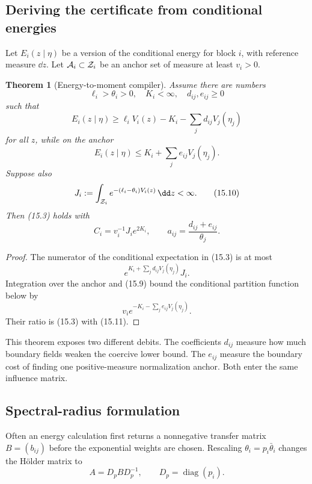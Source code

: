 \documentclass[11pt]{article}
\newtheorem{theorem}{Theorem}[section]
\theoremstyle{remark}
\begin{document}
\subsection{Deriving the certificate from conditional energies}

Let \(E_i(z\mid\eta)\) be a version of the conditional energy for
block \(i\), with reference measure \(\dd z\).  Let
\({\cal A}_i\subset{\cal Z}_i\) be an anchor set of measure at least
\(v_i>0\).

\begin{theorem}[Energy-to-moment compiler]
\label{thm:v17v15-energy-compiler}
Assume there are numbers
\[
 \ell_i>\theta_i>0,\quad K_i<\infty,\quad
 d_{ij},e_{ij}\geq0                                \tag{15.7}
\]
such that
\[
 E_i(z\mid\eta)
 \geq
 \ell_iV_i(z)-K_i-\sum_jd_{ij}V_j(\eta_j)           \tag{15.8}
\]
for all \(z\), while on the anchor
\[
 E_i(z\mid\eta)
 \leq K_i+\sum_je_{ij}V_j(\eta_j).                 \tag{15.9}
\]
Suppose also
\[
 J_i:=\int_{{\cal Z}_i}
 e^{-(\ell_i-\theta_i)V_i(z)}\,\dd z<\infty.        \tag{15.10}
\]
Then (15.3) holds with
\[
 C_i=v_i^{-1}J_i e^{2K_i},\qquad
 a_{ij}=\frac{d_{ij}+e_{ij}}{\theta_j}.            \tag{15.11}
\]
\end{theorem}

\begin{proof}
The numerator of the conditional expectation in (15.3) is at most
\[
 e^{K_i+\sum_jd_{ij}V_j(\eta_j)}J_i.
\]
Integration over the anchor and (15.9) bound the conditional
partition function below by
\[
 v_i e^{-K_i-\sum_je_{ij}V_j(\eta_j)}.
\]
Their ratio is (15.3) with (15.11).
\end{proof}

This theorem exposes two different debits.  The coefficients
\(d_{ij}\) measure how much boundary fields weaken the coercive
lower bound.  The \(e_{ij}\) measure the boundary cost of finding
one positive-measure normalization anchor.  Both enter the same
influence matrix.

\subsection{Spectral-radius formulation}

Often an energy calculation first returns a nonnegative transfer
matrix \(B=(b_{ij})\) before the exponential weights are chosen.
Rescaling \(\theta_i=p_i\bar\theta_i\) changes the H\"older matrix to
\[
 A=D_pBD_p^{-1},
 \qquad D_p=\operatorname{diag}(p_i).               \tag{15.12}
\]
\end{document}
